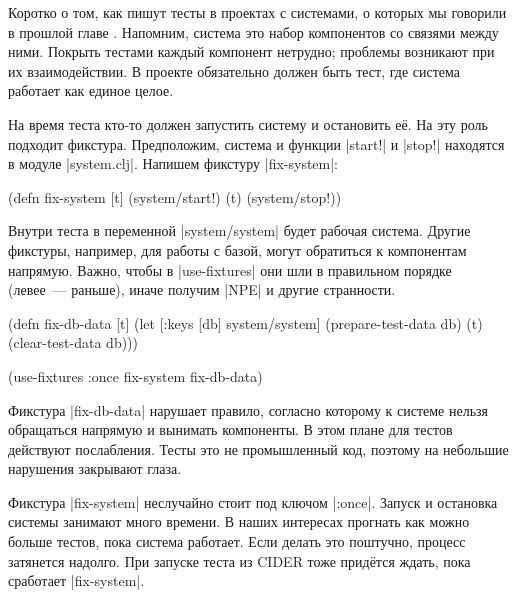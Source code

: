 
Коротко о том, как пишут тесты в проектах с системами, о которых мы говорили в
прошлой главе . Напомним, система это набор компонентов со
связями между ними. Покрыть тестами каждый компонент нетрудно; проблемы
возникают при их взаимодействии. В проекте обязательно должен быть тест, где
система работает как единое целое.


На время теста кто-то должен запустить систему и остановить её. На эту роль
подходит фикстура. Предположим, система и функции \spverb|start!| и
\spverb|stop!| находятся в модуле \spverb|system.clj|. Напишем фикстуру
\spverb|fix-system|:

\begin{english}
  \begin{clojure}
(defn fix-system [t]
  (system/start!)
  (t)
  (system/stop!))
  \end{clojure}
\end{english}

Внутри теста в переменной \spverb|system/system| будет рабочая система. Другие
фикстуры, например, для работы с базой, могут обратиться к компонентам
напрямую. Важно, чтобы в \spverb|use-fixtures| они шли в правильном порядке
(левее~--- раньше), иначе получим \spverb|NPE| и другие странности.


\begin{english}
  \begin{clojure}
(defn fix-db-data [t]
  (let [{:keys [db]} system/system]
    (prepare-test-data db)
    (t)
    (clear-test-data db)))

(use-fixtures :once fix-system fix-db-data)
  \end{clojure}
\end{english}

Фикстура \spverb|fix-db-data| нарушает правило, согласно которому к системе
нельзя обращаться напрямую и вынимать компоненты. В этом плане для тестов
действуют послабления. Тесты это не промышленный код, поэтому на небольшие
нарушения закрывают глаза.

Фикстура \spverb|fix-system| неслучайно стоит под ключом \spverb|:once|. Запуск
и остановка системы занимают много времени. В наших интересах прогнать как можно
больше тестов, пока система работает. Если делать это поштучно, процесс
затянется надолго. При запуске теста из CIDER тоже придётся ждать, пока
сработает \spverb|fix-system|.

